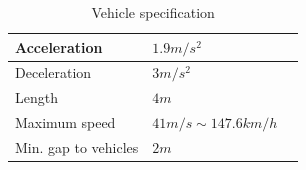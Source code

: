 \begin{table}
\centering
\begin{tabular}{|l|l|l|}\hline
Acceleration			& $1.9 m/s^2$	\\\hline
Deceleration			& $3 m/s^2$ 	\\\hline
Length					& $4 m$ 		\\\hline
Maximum speed			& $41 m/s \sim 147.6 km/h$ \\\hline
Min. gap to vehicles	& $2 m$ 		\\\hline
\end{tabular}
\caption{Vehicle specification}\label{table.vehicleTypes}
\end{table}



